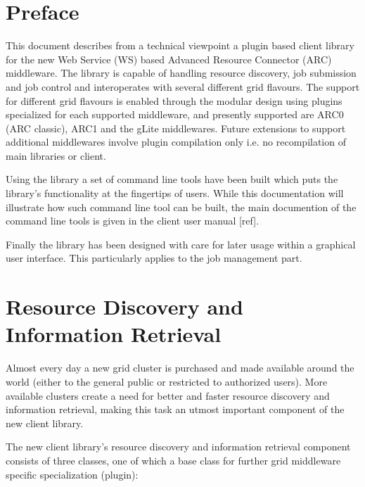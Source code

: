 \documentclass{book}
\begin{document}
\tableofcontents                          %
\newpage
\chapter{Preface}
\label{sec:intro}

This document describes from a technical viewpoint a plugin based client library for the new 
Web Service (WS) based Advanced Resource Connector (ARC) middleware. The library is capable of 
handling resource discovery, job submission and job control and interoperates with several 
different grid flavours. The support for different grid flavours is enabled through the modular 
design using plugins specialized for each supported middleware, and presently supported are ARC0 
(ARC classic), ARC1 and the gLite middlewares. Future extensions to support additional middlewares 
involve plugin compilation only i.e. no recompilation of main libraries or client.

Using the library a set of command line tools have been built which puts the library's functionality 
at the fingertips of users. While this documentation will illustrate how such command line tool can be 
built, the main documention of the command line tools is given in the client user manual [ref].

Finally the library has been designed with care for later usage within a graphical user interface. This 
particularly applies to the job management part.

\chapter{Resource Discovery and Information Retrieval}
\label{sec:TargetDiscovery}
Almost every day a new grid cluster is purchased and made available around the world (either to the 
general public or restricted to authorized users). More available clusters create a need for better and 
faster resource discovery and information retrieval, making this task an utmost important component of the 
new client library.

The new client library's resource discovery and information retrieval component consists of three classes, one 
of which a base class for further grid middleware specific specialization (plugin):
\end{document}
